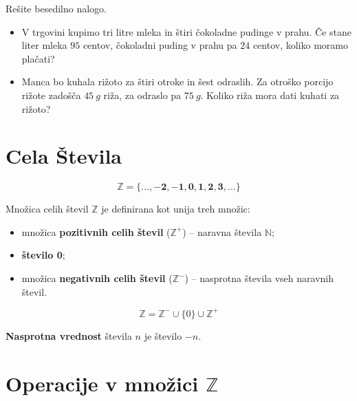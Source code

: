  
     \begin{naloga}
        Rešite besedilno nalogo.
        \begin{itemize}
            \item V trgovini kupimo tri litre mleka in štiri čokoladne pudinge v prahu. Če stane liter mleka $95$ centov,
                čokoladni puding v prahu pa $24$ centov, koliko moramo plačati? 
            \item Manca bo kuhala rižoto za štiri otroke in šest odraslih. Za otroško porcijo rižote zadošča $45~g$ riža,
                za odraslo pa $75~g$. Koliko riža mora dati kuhati za rižoto? 
        \end{itemize}
     \end{naloga}
 


\newpage
   \section{Cela Števila}
         
                    $$\mathbf{\mathbb{Z} = \{\ldots, -2, -1, 0, 1, 2, 3, \ldots\}}$$
                

                 
                    Množica celih števil $\mathbb{Z}$ je definirana kot unija treh množic:
                        \begin{itemize}
                            \item množica \textbf{pozitivnih celih števil} ($\mathbb{Z}^+$) -- naravna števila $\mathbb{N}$;
                            \item \textbf{število 0};
                            \item množica \textbf{negativnih celih števil} ($\mathbb{Z}^-$) -- nasprotna števila vseh naravnih števil.
                        \end{itemize}
                      $$\mathbb{Z} = \mathbb{Z}^- \cup \{0\} \cup \mathbb{Z}^+$$

                 

                 
                    \textbf{Nasprotna vrednost} števila $n$ je število $-n$.
                 
         

         
             \section{Operacije v množici $\mathbb{Z}$}

